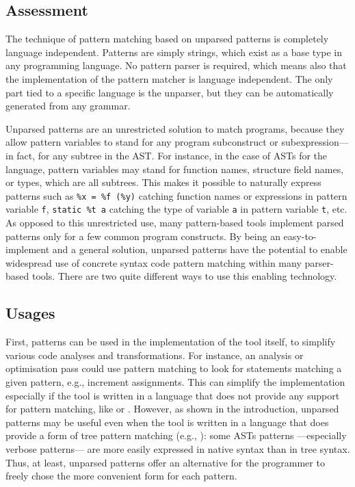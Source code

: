\subsection{Assessment}

The technique of pattern matching based on unparsed patterns is
completely language independent. Patterns are simply strings, which
exist as a base type in any programming language. No pattern parser is
required, which means also that the implementation of the pattern
matcher is language independent. The only part tied to a specific
language is the unparser, but they can be automatically generated from
any grammar. 

Unparsed patterns are an unrestricted solution to match programs,
because they allow pattern variables to stand for any program
sub\-construct or sub\-expression---in fact, for any subtree in the
AST.  For instance, in the case of ASTs for the \Clang language,
pattern variables may stand for function names, structure field names,
or types, which are all subtrees. This makes it possible to naturally
express patterns such as \texttt{\%x = \%f (\%y)} catching function
names or expressions in pattern variable \texttt{f}, \texttt{static
  \%t a} catching the type of variable \texttt{a} in pattern variable
\texttt{t}, etc. As opposed to this unrestricted use, many
pattern\hyp{}based tools implement parsed patterns only for a few
common program constructs. By being an easy\hyp{}to\hyp{}implement and
a general solution, unparsed patterns have the potential to enable
widespread use of concrete syntax code pattern matching within many
parser\hyp{}based tools. There are two quite different ways to use
this enabling technology.

\subsection{Usages}

First, patterns can be used in the implementation of the tool itself,
to simplify various code analyses and transformations. For instance,
an analysis or optimisation pass could use pattern matching to look
for statements matching a given pattern, e.g., increment assignments.
This can simplify the implementation especially if the tool is written
in a language that does not provide any support for pattern matching,
like \Clang or \Java. However, as shown in the introduction, unparsed
patterns may be useful even when the tool is written in a language
that does provide a form of tree pattern matching (e.g., \ML): some
ASTs patterns ---especially verbose patterns--- are more easily
expressed in native syntax than in tree syntax. Thus, at least,
unparsed patterns offer an alternative for the programmer to freely
chose the more convenient form for each pattern.

